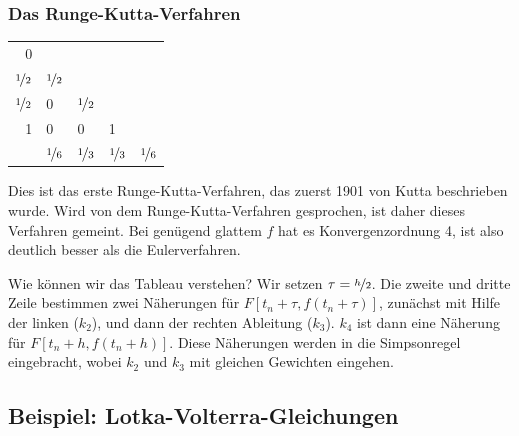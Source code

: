\subsubsection{Das Runge-Kutta-Verfahren}

\begin{center}
  \renewcommand{\arraystretch}{1.3}
  \begin{tabular}{r|llll}
    0 & \\
    $\nicefrac{1}{2}$ & $\nicefrac{1}{2}$ \\
    $\nicefrac{1}{2}$ & 0 & $\nicefrac{1}{2}$ \\
    1 & 0 & 0 & 1 \\
    \hline
    & $\nicefrac{1}{6}$ &  $\nicefrac{1}{3}$ & 
    $\nicefrac{1}{3}$ &  $\nicefrac{1}{6}$
  \end{tabular}
\end{center}

Dies ist das erste Runge-Kutta-Verfahren, das zuerst 1901 von Kutta
beschrieben wurde. Wird von dem Runge-Kutta-Verfahren gesprochen, ist
daher dieses Verfahren gemeint. Bei genügend glattem $f$ hat es
Konvergenzordnung 4, ist also deutlich besser als die Eulerverfahren.

Wie können wir das Tableau verstehen?  Wir setzen
$\tau=\nicefrac{h}{2}$. Die zweite und dritte Zeile bestimmen zwei
Näherungen für $F[t_n+\tau, f(t_n+\tau)]$, zunächst mit Hilfe der
linken ($k_2$), und dann der rechten Ableitung ($k_3$). $k_4$ ist dann
eine Näherung für $F[t_n+h, f(t_n+h)]$. Diese Näherungen werden in die
Simpsonregel eingebracht, wobei $k_2$ und $k_3$ mit gleichen Gewichten
eingehen.

\subsection{Beispiel: Lotka-Volterra-Gleichungen}

